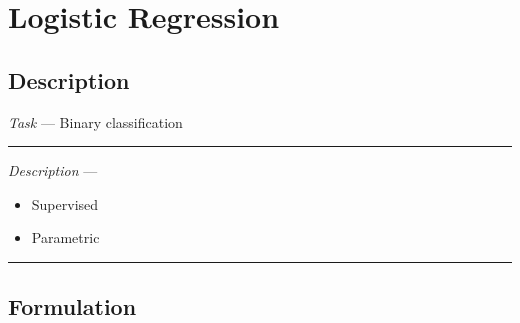 \section{Logistic Regression}
\subsection*{Description}
\emph{Task} --- Binary classification

{\color{lightgray}\hrule height 0.001mm}

\emph{Description} --- 
\begin{itemize}
    \item Supervised
    \item Parametric
\end{itemize}

{\color{black}\hrule height 0.001mm}

\subsection*{Formulation}

